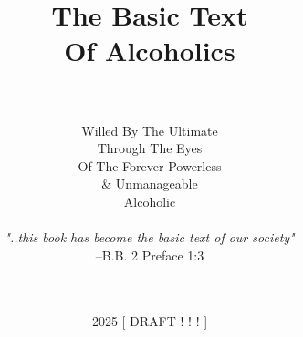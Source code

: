 \title{The Basic Text \\ \vspace*{1em} \Large Of Alcoholics}
\author{
    \hrulefill \\ \\
    Willed By The Ultimate \\
    Through The Eyes \\
    Of The Forever Powerless \\
    \& Unmanageable \\
    Alcoholic \\
    \\
    \emph{"..this book has become the basic text of our society"} \\
    --B.B. 2 Preface 1:3 \\
    \hrulefill \\ \\
}
\date{2025 [ DRAFT ! ! ! ]}
\newcommand{\logo}{symbol1.png}
\newcommand{\bbtitle}{The Basic Text \small Of Alcoholics}
\newcommand{\bbtitleshort}{The Basic Text}

\newcommand{\pseudonym}{Laban Nabal }

\setstocksize{9in}{6in}%
\settrimmedsize{9in}{6in}{*}
\settrims{0in}{0in}

\setcolsepandrule{0.1875in}{0pt}

\settypeblocksize{*}{5.1125in}{*}  %

\checkandfixthelayout

\newcommand{\bbcontentsname}{%
    \headings Books of \bbtitleshort
}

\renewcommand{\textcopyright}{%
    {\fontfamily{DejaVuSerif-TLF}\selectfont ©}
}

\newcommand{\bbChapterPreamble}{%
    \bbHeading{Chapter-Book Preamble}
        Extract from Alcoholics Anonymous 2nd Ed., 
        \textcopyright A.A.W.S. Inc., 
        which is in the U.S. public domain.
        The text is used here for transformation into the verse form of a basic text 
        to facillitate verse based study and commentary.%
    }
